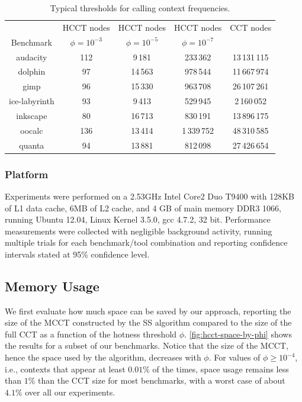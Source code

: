\begin{table}[ht]
\vspace{2mm}
\begin{center}
\begin{tabular}{c c c c c}
\hline
  & HCCT nodes  & HCCT nodes & HCCT nodes & CCT nodes \\ 
Benchmark & $\phi=10^{-3}$  & $\phi=10^{-5}$ & $\phi=10^{-7}$ \\ 
\hline
audacity & 112 & 9\,181 & 233\,362 & 13\,131\,115 \\
dolphin & 97 & 14\,563 & 978\,544 & 11\,667\,974 \\
gimp & 96 & 15\,330 & 963\,708 & 26\,107\,261 \\
ice-labyrinth & 93 & 9\,413 & 529\,945 & 2\,160\,052 \\
inkscape & 80 & 16\,713 & 830\,191 & 13\,896\,175 \\
oocalc & 136 & 13\,414 & 1\,339\,752 & 48\,310\,585 \\
quanta & 94 & 13\,881 & 812\,098 & 27\,426\,654 \\
\hline
\end{tabular}
\vspace{3mm}
\caption{\label{tab:hcct-phi} Typical thresholds for calling context frequencies.}
\end{center}
\end{table}
\ifauthorea{\newline}{}

\subsubsection*{Platform}

Experiments were performed on a 2.53GHz Intel Core2 Duo T9400 with 128KB of L1 data cache, 6MB of L2 cache, and 4 GB of main memory DDR3 1066, running Ubuntu 12.04, Linux Kernel 3.5.0, gcc 4.7.2, 32 bit. Performance measurements were collected with negligible background activity, running multiple trials for each benchmark/tool combination and reporting confidence intervals stated at 95\% confidence level.

\subsection{Memory Usage}

We first evaluate how much space can be saved by our approach, reporting the size of the MCCT constructed by the SS algorithm compared to the size of the full CCT as a function of the hotness threshold $\phi$. \myfigure\ref{fig:hcct-space-by-phi} shows the results for a subset of our benchmarks. Notice that the size of the MCCT, hence the space used by the algorithm, decreases with $\phi$. For values of $\phi\ge 10^{-4}$, i.e., contexts that appear at least $0.01\%$ of the times, space usage remains less than $1\%$ than the CCT size for most benchmarks, with a worst case of about $4.1\%$ over all our experiments.

